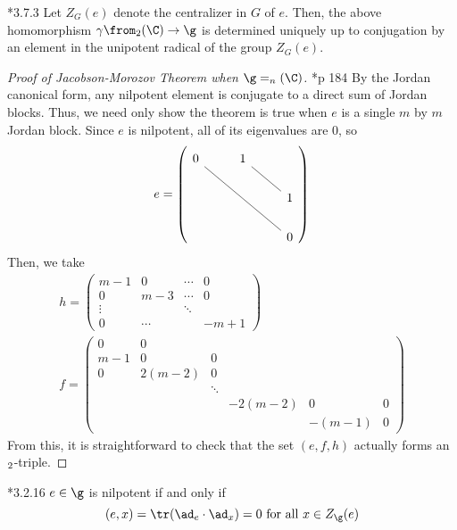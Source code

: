 \documentclass[springer-theory-notes.tex]{subfiles}
\begin{document}
\begin{prop}
  \cite{cg}*{3.7.3} Let \(Z_G(e)\) denote the centralizer in \(G\) of
  \(e\). Then, the 
  above homomorphism \(\gamma \from \sl_2(\C) \to \g\) is determined
  uniquely up to conjugation by an element in the unipotent radical of
  the group \(Z_G(e)\).
\end{prop}
\begin{proof}[Proof of Jacobson-Morozov Theorem when \(\g = \sl_n(\C)\)]
  \cite{cg}*{p 184} By the Jordan canonical form, any nilpotent
  element is conjugate to 
  a direct sum of Jordan blocks. Thus, we need only show the theorem
  is true when \(e\) is a single \(m\) by \(m\) Jordan block. Since
  \(e\) is nilpotent, all of its eigenvalues are \(0\), so \[
    e = \left(
      \begin{tikzcd}
        0 \ar[rrdd, dash]&1 \ar[rd, dash]& \\
        & & 1 \\
        & & 0
      \end{tikzcd}
\right)
\]
Then, we take
\begin{align*}
  h = \left(
    \begin{array}{cccc}
      m-1&0&\cdots&0 \\
      0&m-3&\cdots&0 \\
      \vdots &&\ddots& \\
      0&\cdots& &-m+1
    \end{array}
\right) \\  f = \left(
  \begin{array}{cccccc}
    0&0&&&& \\
    m-1&0&0&&&\\
    0&2(m-2)&0&&&\\
     &&\ddots&&&\\
     &&&-2(m-2)&0&0 \\
    &&&&-(m-1)&0
  \end{array}
\right)
\end{align*}
From this, it is straightforward to check that the set \((e,f,h)\)
actually forms an \(\sl_2\)-triple.
\end{proof}
\begin{lem}
 \cite{cg}*{3.2.16} \(e \in \g\) is nilpotent if and only if \[
    (e,x) = \tr(\ad_e \cdot \ad_x) = 0 \text{ for all } x \in Z_\g(e)
  \]
\end{lem}
\end{document}
